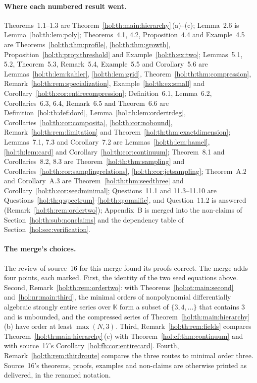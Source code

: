 \documentclass[11pt]{article}
\numberwithin{equation}{section}
\theoremstyle{definition}
\theoremstyle{remark}
\newcommand{\KK}{\mathbb K}
\begin{document}
\paragraph{Where each numbered result went.}
Theorems~1.1--1.3 are Theorem~\ref{hol:th:main:hierarchy}\,(a)--(c);
Lemma~2.6 is Lemma~\ref{hol:th:lem:poly}; Theorems~4.1, 4.2,
Proposition~4.4 and Example~4.5 are Theorems~\ref{hol:th:thm:profile},
\ref{hol:th:thm:growth}, Proposition~\ref{hol:th:prop:threshold} and
Example~\ref{hol:th:ex:two}; Lemmas~5.1, 5.2, Theorem~5.3, Remark~5.4,
Example~5.5 and Corollary~5.6 are Lemmas~\ref{hol:th:lem:kahler},
\ref{hol:th:lem:grid}, Theorem~\ref{hol:th:thm:compression},
Remark~\ref{hol:th:rem:specialization}, Example~\ref{hol:th:ex:small} and
Corollary~\ref{hol:th:cor:entirecompression}; Definition~6.1, Lemma~6.2,
Corollaries~6.3, 6.4, Remark~6.5 and Theorem~6.6 are
Definition~\ref{hol:th:def:dord}, Lemma~\ref{hol:th:lem:ordertrdeg},
Corollaries~\ref{hol:th:cor:composita}, \ref{hol:th:cor:nobound},
Remark~\ref{hol:th:rem:limitation} and Theorem~\ref{hol:th:thm:exactdimension};
Lemmas~7.1, 7.3 and Corollary~7.2 are Lemmas~\ref{hol:th:lem:hamel},
\ref{hol:th:lem:card} and Corollary~\ref{hol:th:cor:continuum};
Theorem~8.1 and Corollaries~8.2, 8.3 are Theorem~\ref{hol:th:thm:sampling}
and Corollaries~\ref{hol:th:cor:samplingrelations},
\ref{hol:th:cor:jetsampling}; Theorem~A.2 and Corollary~A.3 are
Theorem~\ref{hol:th:thm:seedthree} and Corollary~\ref{hol:th:cor:seedminimal};
Questions~11.1 and 11.3--11.10 are
Questions~\ref{hol:th:q:spectrum}--\ref{hol:th:q:omnific}, and Question~11.2 is
answered (Remark~\ref{hol:th:rem:ordertwo}); Appendix~B is merged into the
non-claims of Section~\ref{hol:th:sub:nonclaims} and the dependency table of
Section~\ref{hol:sec:verification}.

\paragraph{The merge's choices.}
The review of source~16 for this merge found its proofs correct. The merge
adds four points, each marked. First, the identity of the two seed equations
above. Second, Remark~\ref{hol:th:rem:ordertwo}: with
Theorems~\ref{hol:ot:main:second} and~\ref{hol:nr:main:third}, the minimal
orders of nonpolynomial differentially algebraic strongly entire series over
$\KK$ form a subset of $\{3,4,\ldots\}$ that contains $3$ and is unbounded, and
the compressed series of Theorem~\ref{hol:th:main:hierarchy}\,(b) have order at
least $\max(N,3)$. Third, Remark~\ref{hol:th:rem:fields} compares
Theorem~\ref{hol:th:main:hierarchy}\,(c) with Theorem~\ref{hol:cf:thm:continuum}
and with source~17's Corollary~\ref{hol:fh:cor:entirecard}. Fourth,
Remark~\ref{hol:th:rem:thirdroute} compares the three routes to minimal order
three. Source~16's theorems, proofs, examples and non-claims are otherwise
printed as delivered, in the renamed notation.
\end{document}
